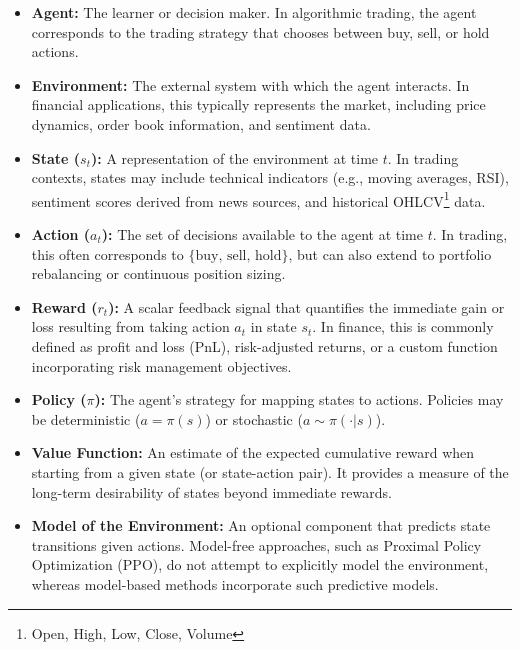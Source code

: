 \documentclass[12pt,a4paper]{report}
\begin{document}
\begin{itemize}
    \item \textbf{Agent:} The learner or decision maker. In algorithmic trading, the agent corresponds to the trading strategy that chooses between buy, sell, or hold actions.
    
    \item \textbf{Environment:} The external system with which the agent interacts. In financial applications, this typically represents the market, including price dynamics, order book information, and sentiment data.
    
    \item \textbf{State ($s_t$):} A representation of the environment at time $t$. In trading contexts, states may include technical indicators (e.g., moving averages, RSI), sentiment scores derived from news sources, and historical OHLCV\footnote{Open, High, Low, Close, Volume} data.
    
    \item \textbf{Action ($a_t$):} The set of decisions available to the agent at time $t$. In trading, this often corresponds to $\{ \text{buy, sell, hold} \}$, but can also extend to portfolio rebalancing or continuous position sizing.
    
    \item \textbf{Reward ($r_t$):} A scalar feedback signal that quantifies the immediate gain or loss resulting from taking action $a_t$ in state $s_t$. In finance, this is commonly defined as profit and loss (PnL), risk-adjusted returns, or a custom function incorporating risk management objectives.
    
    \item \textbf{Policy ($\pi$):} The agent’s strategy for mapping states to actions. Policies may be deterministic ($a = \pi(s)$) or stochastic ($a \sim \pi(\cdot|s)$).
    
    \item \textbf{Value Function:} An estimate of the expected cumulative reward when starting from a given state (or state-action pair). It provides a measure of the long-term desirability of states beyond immediate rewards.
    
    \item \textbf{Model of the Environment:} An optional component that predicts state transitions given actions. Model-free approaches, such as Proximal Policy Optimization (PPO), do not attempt to explicitly model the environment, whereas model-based methods incorporate such predictive models.
\end{itemize}
\end{document}
